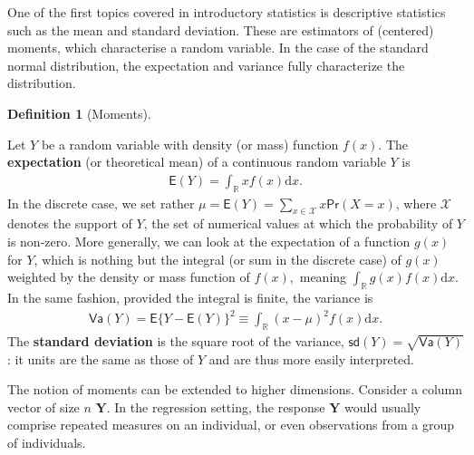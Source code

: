 \documentclass[
  11pt,
  letterpaper,
]{scrbook}
\theoremstyle{definition}
\newtheorem{definition}{Definition}[chapter]
\theoremstyle{definition}
\theoremstyle{plain}
\theoremstyle{plain}
\theoremstyle{remark}
\begin{document}
One of the first topics covered in introductory statistics is
descriptive statistics such as the mean and standard deviation. These
are estimators of (centered) moments, which characterise a random
variable. In the case of the standard normal distribution, the
expectation and variance fully characterize the distribution.

\begin{definition}[Moments]\protect\hypertarget{def-moments}{}\label{def-moments}

Let \(Y\) be a random variable with density (or mass) function \(f(x).\)
The \textbf{expectation} (or theoretical mean) of a continuous random
variable \(Y\) is \begin{align*}
\mathsf{E}(Y)=\int_{\mathbb{R}} x f(x) \mathrm{d} x.
\end{align*} In the discrete case, we set rather
\(\mu = \mathsf{E}(Y)=\sum_{x \in \mathcal{X}} x \mathsf{Pr}(X=x)\),
where \(\mathcal{X}\) denotes the support of \(Y\), the set of numerical
values at which the probability of \(Y\) is non-zero. More generally, we
can look at the expectation of a function \(g(x)\) for \(Y\), which is
nothing but the integral (or sum in the discrete case) of \(g(x)\)
weighted by the density or mass function of \(f(x),\) meaning
\(\int_{\mathbb{R}} g(x) f(x) \mathrm{d} x.\) In the same fashion,
provided the integral is finite, the variance is \begin{align*}
\mathsf{Va}(Y)=\mathsf{E}\{Y-\mathsf{E}(Y)\}^2 \equiv \int_{\mathbb{R}} (x-\mu)^2 f(x) \mathrm{d} x.
\end{align*} The \textbf{standard deviation} is the square root of the
variance, \(\mathsf{sd}(Y)=\sqrt{\mathsf{Va}(Y)}\): it units are the
same as those of \(Y\) and are thus more easily interpreted.

The notion of moments can be extended to higher dimensions. Consider a
column vector of size \(n\) \(\boldsymbol{Y}.\) In the regression
setting, the response \(\boldsymbol{Y}\) would usually comprise repeated
measures on an individual, or even observations from a group of
individuals.


\end{definition}
\end{document}
